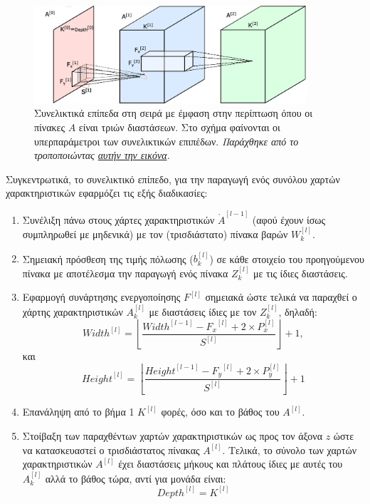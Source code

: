 \begin{figure}[h] 
  \centering
  \includegraphics[width=0.9\textwidth]{images/chapter theoritical background/Convolutional_Layers_of_a_Convolutional_Neural_Network.pdf}
  \caption{Συνελικτικά επίπεδα στη σειρά με έμφαση στην περίπτωση όπου οι πίνακες $A$ είναι τριών διαστάσεων. Στο σχήμα φαίνονται οι υπερπαράμετροι των συνελικτικών επιπέδων. \textit{Παράχθηκε από το \href{https://inkscape.org/}{} τροποποιώντας \href{https://commons.wikimedia.org/wiki/File:Convolutional_Layers_of_a_Convolutional_Neural_Network.svg}{αυτήν την εικόνα}.}}
  \label{fig:_conv3d}
\end{figure}
Συγκεντρωτικά, το συνελικτικό επίπεδο, για την παραγωγή ενός συνόλου χαρτών χαρακτηριστικών εφαρμόζει τις εξής διαδικασίες:
\begin{enumerate}
  \item Συνέλιξη πάνω στους χάρτες χαρακτηριστικών $\grave{A}^{[l-1]}$ (αφού έχουν ίσως συμπληρωθεί με μηδενικά) με τον (τρισδιάστατο) πίνακα βαρών $W^{[l]}_k$.
  \item Σημειακή πρόσθεση της τιμής πόλωσης ($b^{[l]}_k$) σε κάθε στοιχείο του προηγούμενου πίνακα με αποτέλεσμα την παραγωγή ενός πίνακα $Z^{[l]}_k$ με τις ίδιες διαστάσεις.
  \item Εφαρμογή συνάρτησης ενεργοποίησης $F^{[l]}$ σημειακά ώστε τελικά να παραχθεί ο χάρτης χαρακτηριστικών $A^{[l]}_k$ με διαστάσεις ίδιες με τον $Z^{[l]}_k$, δηλαδή: 
  \begin{equation}
  \label{eq:width_conv}
  {Width}^{[l]}= \left\lfloor \frac{{Width}^{[l-1]}-{F_x}^{[l]}+2\times P^{[l]}_x}{S^{[l]}}\right\rfloor  + 1,
  \end{equation}
  και
  \begin{equation}
    \label{eq:height_conv}
    {Height}^{[l]}=\left\lfloor \frac{{Height}^{[l-1]}-{F_y}^{[l]}+2\times P^{[l]}_y}{S^{[l]}}\right\rfloor  + 1
  \end{equation}
  \item Επανάληψη από το βήμα 1 $K^{[l]}$ φορές, όσο και το βάθος του $A^{[l]}$.
  \item Στοίβαξη των παραχθέντων χαρτών χαρακτηριστικών ως προς τον άξονα $z$ ώστε να κατασκευαστεί ο τρισδιάστατος πίνακας $A^{[l]}$. Τελικά, το σύνολο των χαρτών χαρακτηριστικών $A^{[l]}$ έχει διαστάσεις μήκους και πλάτους ίδιες με αυτές του $A^{[l]}_k$ αλλά το βάθος τώρα, αντί για μονάδα είναι:
  \begin{equation}
    {Depth}^{[l]}=K^{[l]}
  \end{equation}
\end{enumerate}
